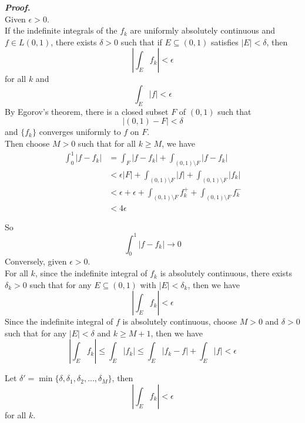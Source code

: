 \documentclass[a4paper,11pt]{article}
\begin{document}
\begin{enumerate}
 		\textit{\textbf {Proof.}}\\
 		Given $\epsilon > 0$.\\
 		If the indefinite integrals of the $f_k$ are uniformly absolutely continuous and $f \in L(0,1)$, there exists $\delta > 0$ such that if $E \subseteq (0,1)$ satisfies $|E| < \delta$, then
 		$$\left| \int_E f_k \right| < \epsilon$$
 		for all $k$ and
 		$$\int_E |f| < \epsilon$$
 		By Egorov's theorem, there is a closed subset $F$ of $(0,1)$ such that
 		$$\left| (0,1) - F \right| < \delta$$
 		and $\{ f_k \}$ converges uniformly to $f$ on $F$.\\
 		Then choose $M > 0$ such that for all $k \geq M$, we have
 		$$\begin{aligned}
 		\int_0^1 |f - f_k|
 		&= \int_F |f - f_k| + \int_{(0,1) \setminus F} |f - f_k|\\
 		&< \epsilon |F| + \int_{(0,1) \setminus F} |f| + \int_{(0,1) \setminus F} |f_k|\\
 		&< \epsilon + \epsilon +\int_{(0,1) \setminus F} f_k^+ + \int_{(0,1) \setminus F} f_k^-\\
 		&< 4\epsilon
 		\end{aligned}$$

 		So
 		$$\int_0^1 |f - f_k| \to 0$$
 		Conversely, given $\epsilon > 0$.\\
 		For all $k$, since the indefinite integral of $f_k$ is absolutely continuous, there exists $\delta_k > 0$ such that for any $E \subseteq (0,1)$ with $|E| < \delta_k$, then we have
 		$$\left| \int_E f_k \right| < \epsilon$$
 		Since the indefinite integral of $f$ is absolutely continuous, choose $M > 0$ and $\delta > 0$ such that for any $|E| < \delta$ and $k \geq M+1$, then we have
 		$$\left| \int_E f_k \right|
 		\leq \int_E |f_k|
 		\leq \int_E |f_k - f| + \int_E |f| < \epsilon$$

 		Let $\delta' = \min \{ \delta, \delta_1, \delta_2,..., \delta_M \}$, then
 		$$\left| \int_E f_k \right| < \epsilon$$
 		for all $k$.






 \end{enumerate}
\end{document}
